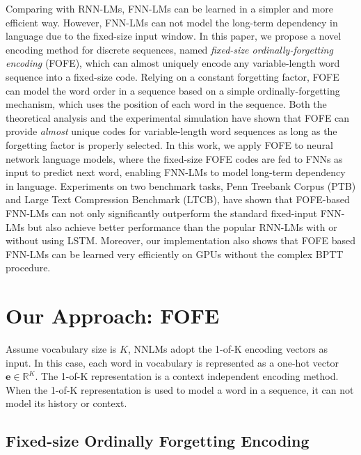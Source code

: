 \documentclass[11pt]{article}
\begin{document}
Comparing with RNN-LMs, FNN-LMs can be learned in a simpler and more efficient way. However, FNN-LMs can not model the long-term dependency in language due to the fixed-size input window. In this paper, we propose a novel encoding method for discrete sequences, named {\em fixed-size ordinally-forgetting encoding} (FOFE), which can almost uniquely encode any variable-length word sequence into a fixed-size code. Relying on a constant forgetting factor, FOFE can model the word order in a sequence based on a simple ordinally-forgetting mechanism, which uses the position of each word in the sequence. Both the theoretical analysis and the experimental simulation have shown that FOFE can provide {\em almost} unique codes for variable-length word sequences as long as the forgetting factor is properly selected. In this work, we apply FOFE to neural network language models, where the fixed-size FOFE codes are fed to FNNs as input to predict next word, enabling FNN-LMs to model long-term dependency in language.  Experiments on two benchmark tasks, Penn Treebank Corpus (PTB) and Large Text Compression Benchmark (LTCB), have shown that FOFE-based FNN-LMs can not only significantly outperform the standard fixed-input FNN-LMs but also achieve better performance than the popular RNN-LMs with or without using LSTM. Moreover, our implementation also shows that FOFE based FNN-LMs can be learned very efficiently on GPUs without the complex BPTT procedure. 

\section{Our Approach: FOFE}
\label{sec.fofe}

Assume vocabulary size is $K$, NNLMs adopt the 1-of-K encoding vectors as input. In this case, each word in vocabulary is represented as a one-hot vector ${\mathbf e} \in \mathbb{R}^{K}$. The 1-of-K representation is a context independent encoding method. When the 1-of-K representation is used to model a word in a sequence, it can not model its history or context. 

\subsection{Fixed-size Ordinally Forgetting Encoding}
\end{document}
